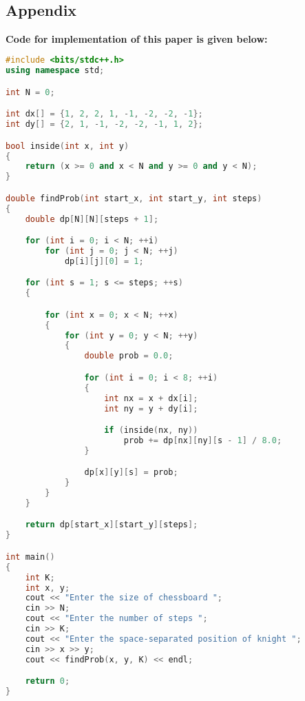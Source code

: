 \documentclass[conference]{IEEEtran}
\begin{document}
\color{black}
\
\begin{titlepage}
    \begin{center}
        \Huge
        \section*{Appendix}
        \end{center}
         \textbf{Code for implementation of this paper is given below:}
\begin{lstlisting}[language=C++,caption=Code for this paper]
#include <bits/stdc++.h>
using namespace std;

int N = 0;

int dx[] = {1, 2, 2, 1, -1, -2, -2, -1};
int dy[] = {2, 1, -1, -2, -2, -1, 1, 2};

bool inside(int x, int y)
{
    return (x >= 0 and x < N and y >= 0 and y < N);
}

double findProb(int start_x, int start_y, int steps)
{
    double dp[N][N][steps + 1];

    for (int i = 0; i < N; ++i)
        for (int j = 0; j < N; ++j)
            dp[i][j][0] = 1;

    for (int s = 1; s <= steps; ++s)
    {

        for (int x = 0; x < N; ++x)
        {
            for (int y = 0; y < N; ++y)
            {
                double prob = 0.0;

                for (int i = 0; i < 8; ++i)
                {
                    int nx = x + dx[i];
                    int ny = y + dy[i];

                    if (inside(nx, ny))
                        prob += dp[nx][ny][s - 1] / 8.0;
                }

                dp[x][y][s] = prob;
            }
        }
    }

    return dp[start_x][start_y][steps];
}

int main()
{
    int K;
    int x, y;
    cout << "Enter the size of chessboard ";
    cin >> N;
    cout << "Enter the number of steps ";
    cin >> K;
    cout << "Enter the space-separated position of knight ";
    cin >> x >> y;
    cout << findProb(x, y, K) << endl;

    return 0;
}

   
\end{lstlisting}
\end{titlepage}
\end{document}
